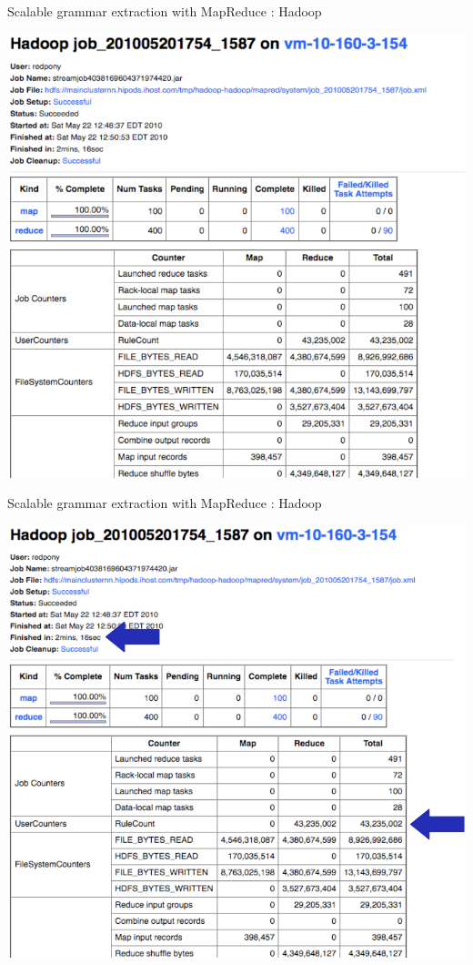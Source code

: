 \documentclass{beamer}
\begin{document}
\begin{frame}[t]{Scalable grammar extraction with MapReduce : Hadoop}
\begin{center}
  \includegraphics[scale=0.4]{hadoop-extract.pdf}
\end{center}
\end{frame}

\begin{frame}[t]{Scalable grammar extraction with MapReduce : Hadoop}
\begin{center}
  \includegraphics[scale=0.4]{hadoop-extract-arrows.pdf}
\end{center}
\end{frame}
\end{document}
